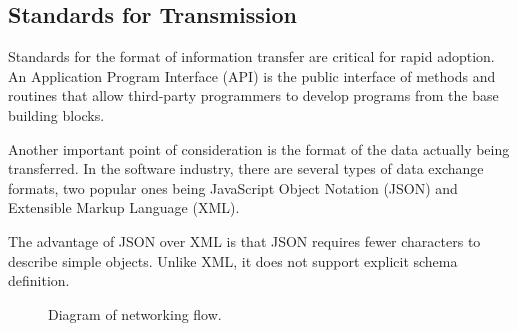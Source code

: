 \subsection{Standards for Transmission}

Standards for the format of information transfer are critical for rapid
adoption. An Application  Program Interface (API) is the public
interface of methods and routines that allow third-party programmers to
develop programs from the base building blocks. 

Another important point of consideration is the format of the data
actually being transferred. In the software industry, there are several
types of data exchange formats, two popular ones being JavaScript Object
Notation (JSON) and Extensible Markup Language (XML). 

The advantage of JSON over XML is that JSON requires fewer characters to
describe simple objects. Unlike XML, it does not support explicit schema
definition. 

\begin{figure}
\caption{Diagram of networking flow.}
\label{fig:NetworkFlow}
\end{figure}



